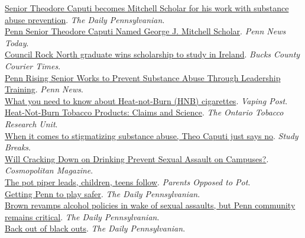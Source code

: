 \documentclass[10pt, letterpaper]{article}
\begin{document}
\href{http://www.thedp.com/article/2016/12/theodore-caputi-named-george-mitchell-scholar}{{Senior Theodore Caputi becomes Mitchell Scholar for his work with substance abuse prevention}}. \emph{The Daily Pennsylvanian}.\\[.2cm]
\href{https://news.upenn.edu/news/penn-senior-theodore-caputi-named-george-j-mitchell-scholar}{{Penn Senior Theodore Caputi Named George J. Mitchell Scholar}}. \emph{Penn News Today}.\\[.2cm]
\href{http://www.buckscountycouriertimes.com/news/local/council-rock-north-graduate-wins-scholarship-to-study-in-ireland/article_2b6a2a76-b338-11e6-933a-e78ecfb6ab7a.html}{{Council Rock North graduate wins scholarship to study in Ireland}}. \emph{Bucks County Courier Times}.\\[.2cm]
\href{https://news.upenn.edu/news/penn-rising-senior-works-prevent-substance-abuse-through-leadership-training}{{Penn Rising Senior Works to Prevent Substance Abuse Through Leadership Training}}. \emph{Penn News}.\\[.2cm]
\href{http://www.vapingpost.com/2016/11/09/what-you-need-to-know-about-heat-not-burn-cigarettes-hnb/}{{What you need to know about Heat-not-Burn (HNB) cigarettes}}. \emph{Vaping Post}.\\[.2cm]
\href{http://otru.org/wp-content/uploads/2016/11/update_nov2016.pdf}{{Heat-Not-Burn Tobacco Products: Claims and Science}}. \emph{The Ontario Tobacco Research Unit}.\\[.2cm]
\href{https://studybreaks.com/2017/04/07/theo-caputi/}{{When it comes to stigmatizing substance abuse, Theo Caputi just says no}}. \emph{Study Breaks}.\\[.2cm]
\href{http://www.cosmopolitan.com/politics/news/a35832/will-cracking-down-on-drinking-prevent-sexual-assault/}{{Will Cracking Down on Drinking Prevent Sexual Assault on Campuses?}}. \emph{Cosmopolitan Magazine}.\\[.2cm]
\href{http://www.poppot.org/2014/09/11/marijuana-activisim-attracts-children-teens/}{{The pot piper leads, children, teens follow}}. \emph{Parents Opposed to Pot}.\\[.2cm]
\href{http://www.thedp.com/article/2014/11/penn-drug-and-alcohol-peer-advisors}{Getting Penn to play safer}. \emph{The Daily Pennsylvanian}.\\[.2cm]
\href{http://www.thedp.com/article/2015/01/new-alcohol-policies-at-brown-leave-penn-community-critical}{Brown revamps alcohol policies in wake of sexual assaults, but Penn community remains critical}. \emph{The Daily Pennsylvanian}. \\[.2cm]
\href{http://www.thedp.com/article/2015/02/dani-blum-back-out-black-outs}{Back out of black outs}. \emph{The Daily Pennsylvanian}. \\[.2cm]
\end{document}

